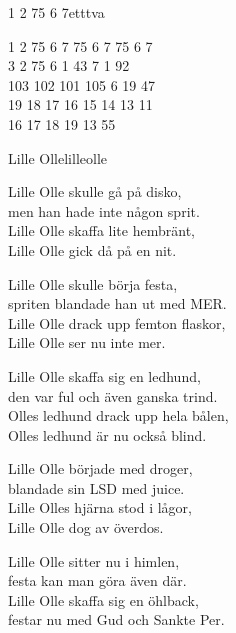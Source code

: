 \begin{song}{1 2 75 6 7}{etttva}
\begin{vers}
1 2 75 6 7 75 6 7 75 6 7\\
3 2 75 6 1 43 7 1 92\\
103 102 101 105 6 19 47\\
19 18 17 16 15 14 13 11\\
16 17 18 19 13 55\\
\end{vers}
\end{song}

\newpage

\begin{song}{Lille Olle}{lilleolle}
\begin{vers}
Lille Olle skulle gå på disko,  \\
men han hade inte någon sprit. \\
Lille Olle skaffa lite hembränt,  \\
Lille Olle gick då på en nit.\\
\end{vers}
\begin{vers}
Lille Olle skulle börja festa,\\
spriten blandade han ut med MER.\\
Lille Olle drack upp femton flaskor,\\
Lille Olle ser nu inte mer.\\
\end{vers}
\begin{vers}
Lille Olle skaffa sig en ledhund,\\
den var ful och även ganska trind.\\
Olles ledhund drack upp hela bålen,\\
Olles ledhund är nu också blind.\\
\end{vers}
\begin{vers}
Lille Olle började med droger,\\
blandade sin LSD med juice.\\
Lille Olles hjärna stod i lågor,\\
Lille Olle dog av överdos.\\
\end{vers}
\begin{vers}
Lille Olle sitter nu i himlen,\\
festa kan man göra även där.\\
Lille Olle skaffa sig en öhlback,\\
festar nu med Gud och Sankte Per.\\
\end{vers}
\end{song}

